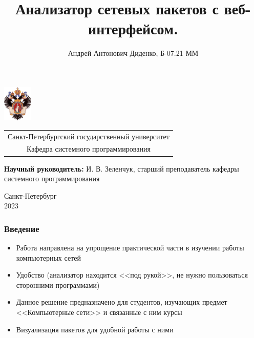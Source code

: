 \documentclass[aspectratio=169]{beamer}
\title[Анализатор сетевых пакетов MimiShark]{Анализатор сетевых пакетов с веб-интерфейсом.}
\institute[СПбГУ]{}
\author[Андрей Диденко]{Андрей Антонович Диденко, Б-07.21 ММ }
\begin{document}
{
\begin{frame}
	\includegraphics[width=1.4cm]{pictures/SPbGU_Logo.png}
	\vspace{-35pt}
	\hspace{-10pt}
	\begin{center}
		\begin{tabular}{c}
			\scriptsize{Санкт-Петербургский государственный университет} \\
			\scriptsize{Кафедра системного программирования}
		\end{tabular}
		\titlepage
	\end{center}

	\btVFill

	{\scriptsize
		{\bfseries Научный руководитель:}  И. В. Зеленчук, старший преподаватель кафедры системного программирования \\
	}
	\begin{center}
		\vspace{5pt}
		\scriptsize{Санкт-Петербург\\
			2023}
	\end{center}

\end{frame}
}

\begin{frame}[fragile]
	\frametitle{Введение}
	\begin{itemize}
		\item Работа направлена на упрощение практической части в изучении работы компьютерных сетей
		\item Удобство (анализатор находится <<под рукой>>, не нужно пользоваться сторонними программами)
		\item Данное решение предназначено для студентов, изучающих предмет <<Компьютерные сети>> и связанные с ним курсы
		\item Визуализация пакетов для удобной работы с ними
	\end{itemize}
\end{frame}
\end{document}
